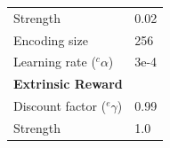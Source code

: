 \documentclass[letterpaper, 10 pt, conference]{ieeeconf}  %
\begin{document}
\begin{table}[t]
\begin{center}
\begin{tabular}{l|l}
			Strength                                  & 0.02                  \\
			Encoding size                             & 256                   \\
			Learning rate ($^{c}\alpha$)              & 3e-4                  \\ \hline
			\multicolumn{2}{l}{\textbf{Extrinsic Reward}}                     \\ \hline
			Discount factor ($^{e}\gamma$)            & 0.99                  \\
			Strength                                  & 1.0                   \\ \hline
		\end{tabular}
	\end{center}
	\label{tab2}
\end{table}
\end{document}
